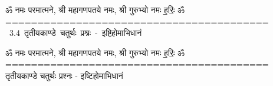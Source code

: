 \documentclass[17pt]{extarticle}
\begin{document}
\begin{titlepage}
    \begin{center}
 
\begin{sanskrit}
    { \Large
    ॐ नमः परमात्मने, श्री महागणपतये नमः, श्री गुरुभ्यो नमः
ह॒रिः॒ ॐ
========================================= 
    }
    \\
    \vspace{2.5cm}
    \mbox{ \Huge
    3.4      तृतीयकाण्डे चतुर्थः प्रश्नः - इष्टिहोमाभिधानं   }
\end{sanskrit}
\end{center}

\end{titlepage}
\tableofcontents

ॐ नमः परमात्मने, श्री महागणपतये नमः, श्री गुरुभ्यो नमः
ह॒रिः॒ ॐ
=========================================       तृतीयकाण्डे चतुर्थः प्रश्नः - इष्टिहोमाभिधानं \newline

\end{document}
